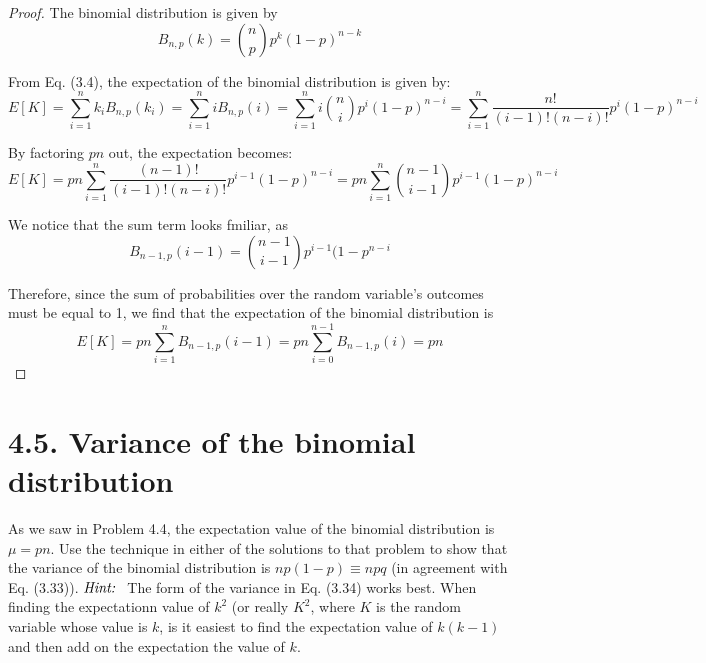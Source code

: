 \begin{proof}
    The binomial distribution is given by
    \begin{equation*}\tag{4.7}
        B_{n, p}(k) = \binom{n}{p}p^k (1 - p)^{n - k}
    \end{equation*}

    From Eq. (3.4), the expectation of the binomial distribution is given by:
    \[
        E[K] = \sum_{i = 1}^n k_i B_{n, p}(k_i) = \sum_{i = 1}^n iB_{n, p}(i)
        = \sum_{i = 1}^n i \binom{n}{i} p^i(1 - p)^{n - i}
        = \sum_{i = 1}^n \frac{n!}{(i - 1)! (n - i)!} p^i(1 - p)^{n - i}
    \] 

    By factoring $pn$ out, the expectation becomes:
    \[
        E[K] = pn \sum_{i = 1}^n \frac{(n - 1)!}{(i - 1)! (n - i)!} p^{i - 1}(1 - p)^{n - i}
        = pn \sum_{i = 1}^n \binom{n - 1}{i - 1} p^{i - 1}(1 - p)^{n - i}
    \] 

    We notice that the sum term looks fmiliar, as
    \[
        B_{n - 1, p}(i - 1) = \binom{n - 1}{i - 1} p^{i - 1}(1 - p^{n - i}
    \] 

    Therefore, since the sum of probabilities over the random variable's outcomes must be equal to 1,
    we find that the expectation of the binomial distribution is 
    \[
        E[K] = pn \sum_{i = 1}^n B_{n - 1, p}(i - 1) = pn \sum_{i = 0}^{n - 1} B_{n - 1, p}(i) = pn
    \] 
\end{proof}

\section*{4.5. Variance of the binomial distribution}
As we saw in Problem 4.4, the expectation value of the binomial distribution
is $\mu = pn$. Use the technique in either of the solutions to that problem
to show that the variance of the binomial distribution is  $np(1 - p) \equiv npq$
(in agreement with Eq. (3.33)). $\emph{Hint: }$ The form of the variance in 
Eq. (3.34) works best. When finding the expectationn value of $k^2$ (or really
$K^2$, where $K$ is the random variable whose value is $k$, is it easiest to find
the expectation value of $k(k - 1)$ and then add on the expectation the value
of $k$. 

\vspace{1em}

